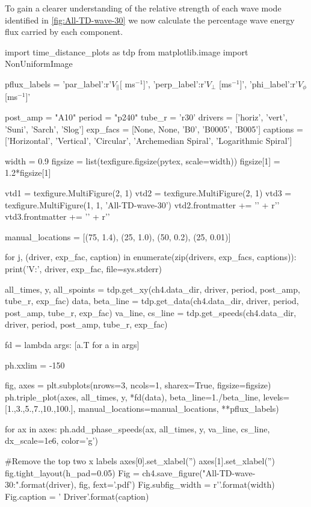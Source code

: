 To gain a clearer understanding of the relative strength of each wave mode identified in \cref{fig:All-TD-wave-30} we now calculate the percentage wave energy flux carried by each component.

\begin{pycode}[chapter4]
import time_distance_plots as tdp
from matplotlib.image import NonUniformImage

pflux_labels = {'par_label':r'$V_\parallel[$ ms$^{-1}$]',
                'perp_label':r'$V_\perp$ [ms$^{-1}$]',
                'phi_label':r'$V_\phi$ [ms$^{-1}$]'}

post_amp = "A10"
period = "p240"
tube_r = 'r30'
drivers = ['horiz', 'vert', 'Suni', 'Sarch', 'Slog']
exp_facs = [None, None, 'B0', 'B0005', 'B005']
captions = ['Horizontal', 'Vertical', 'Circular', 'Archemedian Spiral', 'Logarithmic Spiral']

width = 0.9
figsize = list(texfigure.figsize(pytex, scale=width))
figsize[1] = 1.2*figsize[1]

vtd1 = texfigure.MultiFigure(2, 1)
vtd2 = texfigure.MultiFigure(2, 1)
vtd3 = texfigure.MultiFigure(1, 1, 'All-TD-wave-30')
vtd2.frontmatter += '\n' + r'\ContinuedFloat'
vtd3.frontmatter += '\n' + r'\ContinuedFloat'

manual_locations = [(75, 1.4), (25, 1.0), (50, 0.2), (25, 0.01)]

for j, (driver, exp_fac, caption) in enumerate(zip(drivers, exp_facs, captions)):
    print('V:', driver, exp_fac, file=sys.stderr)

    all_times, y, all_spoints = tdp.get_xy(ch4.data_dir, driver, period, post_amp, tube_r, exp_fac)
    data, beta_line = tdp.get_data(ch4.data_dir, driver, period, post_amp, tube_r, exp_fac)
    va_line, cs_line = tdp.get_speeds(ch4.data_dir, driver, period, post_amp, tube_r, exp_fac)

    fd = lambda args: [a.T for a in args]

    ph.xxlim = -150

    fig, axes = plt.subplots(nrows=3, ncols=1, sharex=True, figsize=figsize)
    ph.triple_plot(axes, all_times, y, *fd(data), beta_line=1./beta_line,
                   levels=[1.,3.,5.,7.,10.,100.], manual_locations=manual_locations, **pflux_labels)

    for ax in axes:
        ph.add_phase_speeds(ax, all_times, y, va_line, cs_line, dx_scale=1e6, color='g')

    #Remove the top two x labels
    axes[0].set_xlabel('')
    axes[1].set_xlabel('')
    fig.tight_layout(h_pad=0.05)
    Fig = ch4.save_figure("All-TD-wave-30:{}".format(driver), fig, fext='.pdf')
    Fig.subfig_width = r'{}\columnwidth'.format(width)
    Fig.caption = '{} Driver'.format(caption)



\end{pycode}
